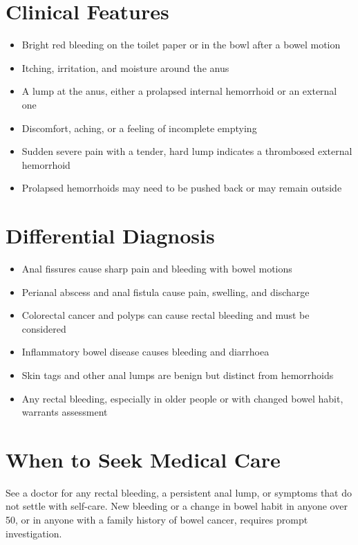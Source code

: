 \section*{Clinical Features}
\begin{itemize}
    \item Bright red bleeding on the toilet paper or in the bowl after a bowel motion
    \item Itching, irritation, and moisture around the anus
    \item A lump at the anus, either a prolapsed internal hemorrhoid or an external one
    \item Discomfort, aching, or a feeling of incomplete emptying
    \item Sudden severe pain with a tender, hard lump indicates a thrombosed external hemorrhoid
    \item Prolapsed hemorrhoids may need to be pushed back or may remain outside
\end{itemize}

\section*{Differential Diagnosis}
\begin{itemize}
    \item Anal fissures cause sharp pain and bleeding with bowel motions
    \item Perianal abscess and anal fistula cause pain, swelling, and discharge
    \item Colorectal cancer and polyps can cause rectal bleeding and must be considered
    \item Inflammatory bowel disease causes bleeding and diarrhoea
    \item Skin tags and other anal lumps are benign but distinct from hemorrhoids
    \item Any rectal bleeding, especially in older people or with changed bowel habit, warrants assessment
\end{itemize}

\section*{When to Seek Medical Care}
See a doctor for any rectal bleeding, a persistent anal lump, or symptoms that do not settle with self-care. New bleeding or a change in bowel habit in anyone over 50, or in anyone with a family history of bowel cancer, requires prompt investigation.

